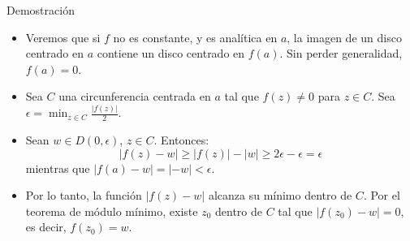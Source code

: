 \documentclass[spanish,presentation]{beamer}
\begin{document}
\begin{frame}[label=sec-2-2]{}
\begin{block}{Demostración}
\begin{itemize}
\item Veremos que si \(f\) no es constante, y es analítica en \(a\),
la imagen de un disco centrado en \(a\) contiene un disco
centrado en \(f(a)\). Sin perder generalidad, \(f(a)=0\).
\item Sea \(C\) una circunferencia centrada en \(a\) tal que \(f(z)\ne
      0\) para \(z\in C\). Sea \(\epsilon=\min_{z\in C}\frac{|f(z)|}{2}\).
\item Sean \(w\in D(0,\epsilon)\), \(z\in C\). Entonces:
\begin{displaymath}
|f(z)-w|\geq |f(z)|-|w|\geq 2\epsilon-\epsilon=\epsilon
\end{displaymath}
mientras que \(|f(a)-w|=|-w|<\epsilon\).
\item Por lo tanto, la función \(|f(z)-w|\) alcanza su mínimo dentro
de \(C\). Por el teorema de módulo mínimo, existe \(z_{0}\)
dentro de \(C\) tal que \(|f(z_{0})-w|=0\), es decir, \(f(z_{0})=w\).
\end{itemize}
\end{block}
\end{frame}
\end{document}
